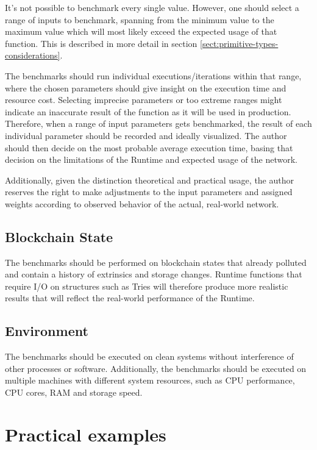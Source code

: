 \documentclass[11pt,a4paper]{article}
\begin{document}
It's not possible to benchmark every single value. However, one should select a
range of inputs to benchmark, spanning from the minimum value to the maximum
value which will most likely exceed the expected usage of that function. This is
described in more detail in section \ref{sect:primitive-types-considerations}.
\newline

The benchmarks should run individual executions/iterations within that range,
where the chosen parameters should give insight on the execution time and
resource cost. Selecting imprecise parameters or too extreme ranges might
indicate an inaccurate result of the function as it will be used in production.
Therefore, when a range of input parameters gets benchmarked, the result of each
individual parameter should be recorded and ideally visualized. The author
should then decide on the most probable average execution time, basing that
decision on the limitations of the Runtime and expected usage of the network.
\newline

Additionally, given the distinction theoretical and practical usage, the author
reserves the right to make adjustments to the input parameters and assigned
weights according to observed behavior of the actual, real-world network.

\subsection{Blockchain State}\label{sec:blockchain-state}
The benchmarks should be performed on blockchain states that already polluted
and contain a history of extrinsics and storage changes. Runtime functions that
require I/O on structures such as Tries will therefore produce more realistic
results that will reflect the real-world performance of the Runtime.

\subsection{Environment}
The benchmarks should be executed on clean systems without interference of other
processes or software. Additionally, the benchmarks should be executed on
multiple machines with different system resources, such as CPU performance, CPU
cores, RAM and storage speed.

\section{Practical examples}\label{sec:practical-examples}
\end{document}
